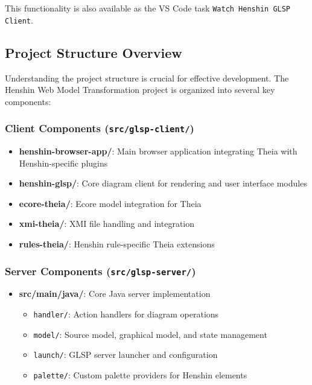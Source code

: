 This functionality is also available as the VS Code task \texttt{Watch Henshin GLSP Client}.

\subsection{Project Structure Overview}
\label{subsec:project_structure}

Understanding the project structure is crucial for effective development. The Henshin Web Model Transformation project is organized into several key components:

\subsubsection{Client Components (\texttt{src/glsp-client/})}

\begin{itemize}
    \item \textbf{henshin-browser-app/}: Main browser application integrating Theia with Henshin-specific plugins
    \item \textbf{henshin-glsp/}: Core diagram client for rendering and user interface modules
    \item \textbf{ecore-theia/}: Ecore model integration for Theia
    \item \textbf{xmi-theia/}: XMI file handling and integration
    \item \textbf{rules-theia/}: Henshin rule-specific Theia extensions
\end{itemize}

\subsubsection{Server Components (\texttt{src/glsp-server/})}

\begin{itemize}
    \item \textbf{src/main/java/}: Core Java server implementation
    \begin{itemize}
        \item \texttt{handler/}: Action handlers for diagram operations
        \item \texttt{model/}: Source model, graphical model, and state management
        \item \texttt{launch/}: GLSP server launcher and configuration
        \item \texttt{palette/}: Custom palette providers for Henshin elements
    \end{itemize}
\end{itemize}

